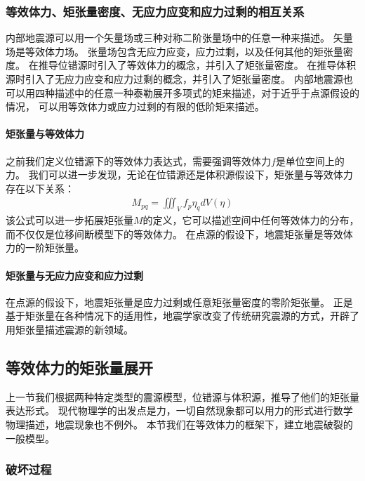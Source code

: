 \subsubsection{等效体力、矩张量密度、无应力应变和应力过剩的相互关系}

内部地震源可以用一个矢量场或三种对称二阶张量场中的任意一种来描述。
矢量场是等效体力场。
张量场包含无应力应变，应力过剩，以及任何其他的矩张量密度。
在推导位错源时引入了等效体力的概念，并引入了矩张量密度。
在推导体积源时引入了无应力应变和应力过剩的概念，并引入了矩张量密度。
内部地震源也可以用四种描述中的任意一种泰勒展开多项式的矩来描述，对于近乎于点源假设的情况，
可以用等效体力或应力过剩的有限的低阶矩来描述。
\paragraph{矩张量与等效体力}
之前我们定义位错源下的等效体力表达式，需要强调等效体力$f$是单位空间上的力。
我们可以进一步发现，无论在位错源还是体积源假设下，矩张量与等效体力存在以下关系：
\begin{align}
    M_{pq} =  \iiint\nolimits_{V} f_p \eta_q dV(\eta)
  \label{equ:moment-tensor-with-eq}
\end{align}
该公式可以进一步拓展矩张量$M$的定义，它可以描述空间中任何等效体力的分布，而不仅仅是位移间断模型下的等效体力。
在点源的假设下，地震矩张量是等效体力的一阶矩张量。

\paragraph{矩张量与无应力应变和应力过剩}
在点源的假设下，地震矩张量是应力过剩或任意矩张量密度的零阶矩张量。
正是基于矩张量在各种情况下的适用性，地震学家改变了传统研究震源的方式，开辟了用矩张量描述震源的新领域。








\subsection{等效体力的矩张量展开}

上一节我们根据两种特定类型的震源模型，位错源与体积源，推导了他们的矩张量表达形式。
现代物理学的出发点是力，一切自然现象都可以用力的形式进行数学物理描述，地震现象也不例外。
本节我们在等效体力的框架下，建立地震破裂的一般模型。


\subsubsection{破坏过程}

